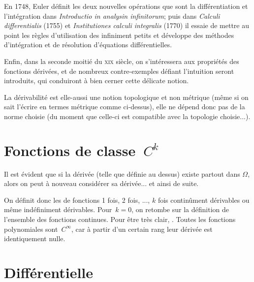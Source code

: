 \begin{histoire}
\medskip
En 1748, Euler définit les deux nouvelles opérations que sont la différentiation et l'intégration dans \emph{Introductio in analysin infinitorum}; puis dans \emph{Calculi differentialis} (1755) et \emph{Institutiones calculi integralis} (1770) il essaie de mettre au point les règles d'utilisation des infiniment petits et développe des méthodes d'intégration et de résolution d'équations différentielles.

\medskip
Enfin, dans la seconde moitié du \textsc{xix} siècle, on s'intéressera aux propriétés des fonctions dérivées, et de nombreux contre-exemples défiant l'intuition seront introduits, qui conduiront à bien cerner cette délicate notion.
\end{histoire}

\medskip
La dérivabilité est elle-aussi une notion topologique et non métrique (même si on sait l'écrire en termes métrique comme ci-dessus), elle ne dépend donc pas de la norme choisie (du moment que celle-ci est compatible avec la topologie choisie...).


\medskip
\section{Fonctions de classe~$C^k$}

Il est évident que si la dérivée (telle que définie au dessus) existe partout dans $\Omega$, alors on peut à nouveau considérer sa dérivée... et ainsi de suite.

On définit donc les  de fonctions 1 fois, 2 fois, ..., $k$ fois continûment dérivables ou même indéfiniment dérivables.
\medskipvm
Pour~$k=0$, on retombe sur la définition de l'ensemble des fonctions continues.
\medskipvm
Pour être très clair, .
\medskipvm
Toutes les fonctions polynomiales sont~$C^\infty$, car à partir d'un certain rang leur dérivée est identiquement nulle.

\medskip
\section{Différentielle}\label{Sec-Differentielle}

